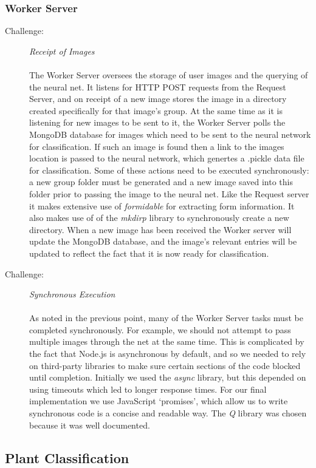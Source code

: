 \documentclass[a4paper,11pt]{article}
\begin{document}
\subsubsection{Worker Server}
\begin{description}
\item [Challenge:] \textit{Receipt of Images}\\\\
The Worker Server oversees the storage of user images and the querying of the neural net. It listens for HTTP POST requests from the Request Server, and on receipt of a new image stores the image in a directory created specifically for that image's group. At the same time as it is listening for new images to be sent to it, the Worker Server polls the MongoDB database for images which need to be sent to the neural network for classification. If such an image is found then a link to the images location is passed to the neural network, which genertes a .pickle data file for classification. Some of these actions need to be executed synchronously: a new group folder must be generated and a new image saved into this folder prior to passing the image to the neural net. Like the Request server it makes extensive use of \textit{formidable} for extracting form information. It also makes use of of the \textit{mkdirp} library to synchronously create a new directory. When a new image has been received the Worker server will update the MongoDB database, and the image's relevant entries will be updated to reflect the fact that it is now ready for classification. \\

\item [Challenge:] \textit{Synchronous Execution}\\\\
As noted in the previous point, many of the Worker Server tasks must be completed synchronously. For example, we should not attempt to pass multiple images through the net at the same time. This is complicated by the fact that Node.js is asynchronous by default, and so we needed to rely on third-party libraries to make sure certain sections of the code blocked until completion. Initially we used the \textit{async} library, but this depended on using timeouts which led to longer response times. For our final implementation we use JavaScript `promises', which allow us to write synchronous code is a concise and readable way. The \textit{Q} library was chosen because it was well documented. 
\end{description}
\subsection{Plant Classification}
\end{document}
